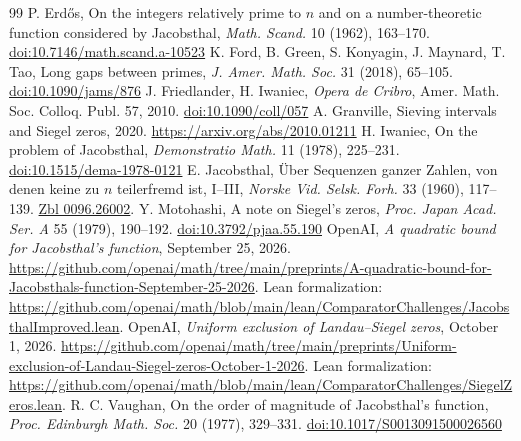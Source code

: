 \documentclass[11pt]{amsart}
\newcommand{\doi}[1]{\href{https://doi.org/#1}{doi:#1}}
\begin{document}
\begin{thebibliography}{99}
 P. Erd\H{o}s, On the integers relatively prime to $n$ and on a number-theoretic function considered by Jacobsthal, \emph{Math. Scand.} 10 (1962), 163--170. \doi{10.7146/math.scand.a-10523}
 K. Ford, B. Green, S. Konyagin, J. Maynard, T. Tao, Long gaps between primes, \emph{J. Amer. Math. Soc.} 31 (2018), 65--105. \doi{10.1090/jams/876}
 J. Friedlander, H. Iwaniec, \emph{Opera de Cribro}, Amer. Math. Soc. Colloq. Publ. 57, 2010. \doi{10.1090/coll/057}
 A. Granville, Sieving intervals and Siegel zeros, 2020. \url{https://arxiv.org/abs/2010.01211}
 H. Iwaniec, On the problem of Jacobsthal, \emph{Demonstratio Math.} 11 (1978), 225--231. \doi{10.1515/dema-1978-0121}
 E. Jacobsthal, \"Uber Sequenzen ganzer Zahlen, von denen keine zu $n$ teilerfremd ist, I--III, \emph{Norske Vid. Selsk. Forh.} 33 (1960), 117--139. \href{https://zbmath.org/0096.26002}{Zbl 0096.26002}.
 Y. Motohashi, A note on Siegel's zeros, \emph{Proc. Japan Acad. Ser. A} 55 (1979), 190--192. \doi{10.3792/pjaa.55.190}
 OpenAI, \emph{A quadratic bound for Jacobsthal's function}, September 25, 2026. \url{https://github.com/openai/math/tree/main/preprints/A-quadratic-bound-for-Jacobsthals-function-September-25-2026}. Lean formalization: \url{https://github.com/openai/math/blob/main/lean/ComparatorChallenges/JacobsthalImproved.lean}.
 OpenAI, \emph{Uniform exclusion of Landau--Siegel zeros}, October 1, 2026. \url{https://github.com/openai/math/tree/main/preprints/Uniform-exclusion-of-Landau-Siegel-zeros-October-1-2026}. Lean formalization: \url{https://github.com/openai/math/blob/main/lean/ComparatorChallenges/SiegelZeros.lean}.
 R. C. Vaughan, On the order of magnitude of Jacobsthal's function, \emph{Proc. Edinburgh Math. Soc.} 20 (1977), 329--331. \doi{10.1017/S0013091500026560}
\end{thebibliography}
\end{document}
